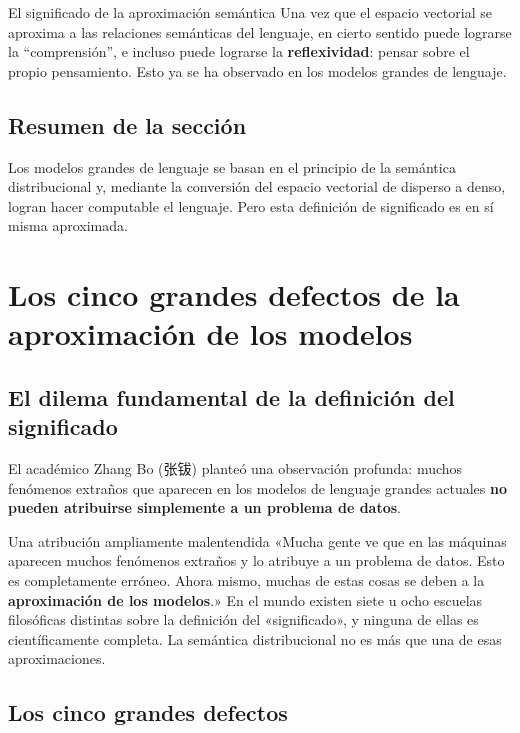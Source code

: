 \documentclass[a4paper]{article}
\begin{document}
\begin{importantbox}{El significado de la aproximación semántica}
Una vez que el espacio vectorial se aproxima a las relaciones semánticas del lenguaje, en cierto sentido puede lograrse la ``comprensión'', e incluso puede lograrse la \textbf{reflexividad}: pensar sobre el propio pensamiento. Esto ya se ha observado en los modelos grandes de lenguaje.
\end{importantbox}

\subsection{Resumen de la sección}

Los modelos grandes de lenguaje se basan en el principio de la semántica distribucional y, mediante la conversión del espacio vectorial de disperso a denso, logran hacer computable el lenguaje. Pero esta definición de significado es en sí misma aproximada.

\section{Los cinco grandes defectos de la aproximación de los modelos}

\subsection{El dilema fundamental de la definición del significado}

El académico Zhang Bo (张钹) planteó una observación profunda: muchos fenómenos extraños que aparecen en los modelos de lenguaje grandes actuales \textbf{no pueden atribuirse simplemente a un problema de datos}.

\begin{warningbox}{Una atribución ampliamente malentendida}
«Mucha gente ve que en las máquinas aparecen muchos fenómenos extraños y lo atribuye a un problema de datos. Esto es completamente erróneo. Ahora mismo, muchas de estas cosas se deben a la \textbf{aproximación de los modelos}.» En el mundo existen siete u ocho escuelas filosóficas distintas sobre la definición del «significado», y ninguna de ellas es científicamente completa. La semántica distribucional no es más que una de esas aproximaciones.
\end{warningbox}

\subsection{Los cinco grandes defectos}
\end{document}
